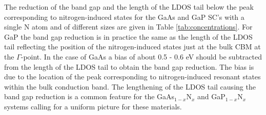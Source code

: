 \documentclass[aps,prb,10pt,twocolumn,groupedaddress]{revtex4-1}
\begin{document}
The reduction of the band gap and the length of the LDOS tail below the peak
corresponding to nitrogen-induced states for the GaAs and GaP SC's with a 
single N atom 
and of different sizes are given in Table \ref{tab:concentrations}. For GaP the
band gap reduction is in practice the same as the length of the LDOS tail 
reflecting the position of the nitrogen-induced states just at 
the bulk CBM at the $\Gamma$-point. In the case of GaAs
a bias of about 0.5 - 0.6 eV should be subtracted from the length of the LDOS 
tail to obtain the band gap reduction. The bias is due to the location of the 
peak corresponding to nitrogen-induced resonant states within the bulk 
conduction band. The lengthening of the LDOS tail 
causing the band gap reduction is a common feature for the GaAs$_{1-x}$N$_x$ and 
GaP$_{1-x}$N$_x$ systems calling for a uniform picture for these materials.
\end{document}
